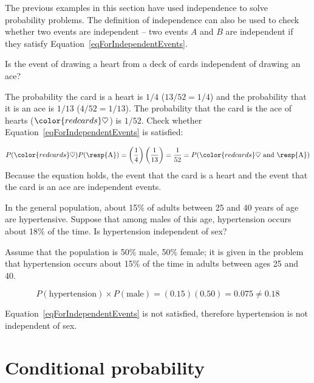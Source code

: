 The previous examples in this section have used independence to solve probability problems. The definition of independence can also be used to check whether two events are independent -- two events $A$ and $B$ are independent if they satisfy Equation~\eqref{eqForIndependentEvents}.

\begin{example}{Is the event of drawing a heart from a deck of cards independent of drawing an ace?}

The probability the card is a heart is $1/4$ ($13/52=1/4$) and the probability that it is an ace is $1/13$ ($4/52=1/13$). The probability that the card is the ace of hearts (${\color{redcards}\heartsuit}$) is $1/52$. Check whether Equation~\ref{eqForIndependentEvents} is satisfied:

\begin{align*}
P({\color{redcards}\heartsuit}) P(\text{\resp{A}}) = \left(\frac{1}{4} \right) \left( \frac{1}{13} \right) = \frac{1}{52} 
= P({\color{redcards}\heartsuit}\text{ and \resp{A}})
\end{align*}
Because the equation holds, the event that the card is a heart and the event that the card is an ace are independent events.
	
\end{example}

\begin{example}
 {In the general population, about 15\% of adults between 25 and 40  years of age are hypertensive.  Suppose that among males of this age, hypertension occurs about 18\% of the time.  Is hypertension independent of sex?} 

Assume that the population is 50\% male, 50\% female; it is given in the problem that hypertension occurs about 15\% of the time in adults between ages 25 and 40. 

\[P(\text{hypertension}) \times P(\text{male}) = (0.15)(0.50) = 0.075 \neq 0.18\] 

Equation~\ref{eqForIndependentEvents} is not satisfied, therefore hypertension is not independent of sex.

\end{example}



\section{Conditional probability}
\label{conditionalProbabilitySection}

